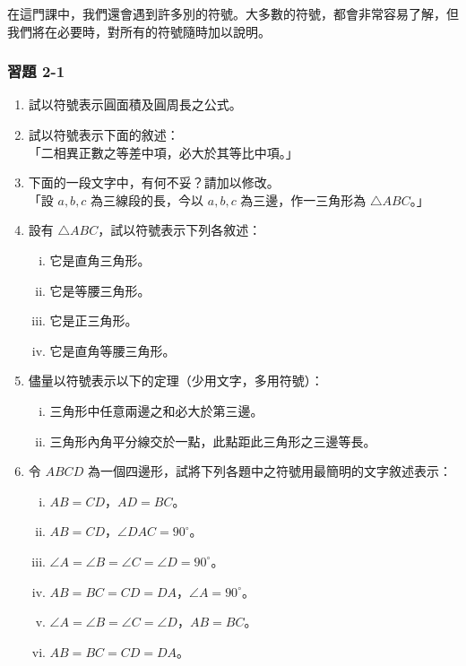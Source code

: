 在這門課中，我們還會遇到許多別的符號。大多數的符號，都會非常容易了解，但我們將在必要時，對所有的符號隨時加以說明。

\subsubsection*{習題 2-1}\label{sec:ex2-1}

\begin{enumerate}[1., leftmargin=2em]
  \item 試以符號表示圓面積及圓周長之公式。
  \item 試以符號表示下面的敘述：\\
  「二相異正數之等差中項，必大於其等比中項。」
  \item 下面的一段文字中，有何不妥？請加以修改。\\
  「設 $a, b, c$ 為三線段的長，今以 $a, b, c$ 為三邊，作一三角形為 $\triangle ABC$。」
  \item 設有 $\triangle ABC$，試以符號表示下列各敘述：
  \begin{enumerate}[(i)]
    \item 它是直角三角形。
    \item 它是等腰三角形。
    \item 它是正三角形。
    \item 它是直角等腰三角形。
  \end{enumerate}
  \item 儘量以符號表示以下的定理（少用文字，多用符號）：
  \begin{enumerate}[(i)]
    \item 三角形中任意兩邊之和必大於第三邊。
    \item 三角形內角平分線交於一點，此點距此三角形之三邊等長。
  \end{enumerate}
  \item 令 $ABCD$ 為一個四邊形，試將下列各題中之符號用最簡明的文字敘述表示：
  \begin{enumerate}[(i)]
    \item $AB = CD$，$AD = BC$。
    \item $AB = CD$，$\angle DAC = 90^\circ$。
    \item $\angle A = \angle B = \angle C = \angle D = 90^\circ$。
    \item $AB = BC = CD = DA$，$\angle A = 90^\circ$。
    \item $\angle A = \angle B = \angle C = \angle D$，$AB = BC$。
    \item $AB = BC = CD = DA$。

\end{enumerate}
\end{enumerate}
